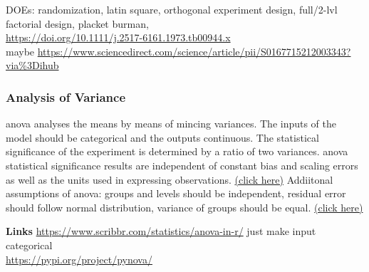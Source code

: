 DOEs: randomization, latin square, orthogonal experiment design, full/2-lvl factorial design, placket burman, \\
\url{https://doi.org/10.1111/j.2517-6161.1973.tb00944.x}\cite{whittle1973some}  \\
maybe \url{https://www.sciencedirect.com/science/article/pii/S0167715212003343?via\%3Dihub}
\fi

\subsubsection{Analysis of Variance} %
\Gls{anova} analyses the means by means of mincing variances.
The inputs of the model should be categorical and the outputs continuous. 
The statistical significance of the experiment is determined by a ratio of two variances. 
\Gls{anova} statistical significance results are independent of constant bias and 
scaling errors as well as the units used in expressing observations. 
\href{https://en.wikipedia.org/wiki/Analysis_of_variance#Summary_of_assumptions}{(click here)}
Addiitonal assumptions of \gls{anova}: groups and levels should be independent, 
residual error should follow normal distribution, variance of groups should be equal. 
\href{https://statsandr.com/blog/anova-in-r/}{(click here)}

\textbf{Links}
\url{https://www.scribbr.com/statistics/anova-in-r/} just make input categorical\\
\url{https://pypi.org/project/pynova/}\\


